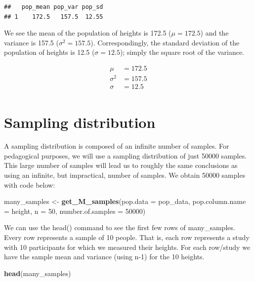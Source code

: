 \documentclass[
]{krantz}
\makeatletter
\newenvironment{Shaded}{\begin{snugshade}}{\end{snugshade}}
\newcommand{\DataTypeTok}[1]{\textcolor[rgb]{0.27,0.27,0.27}{#1}}
\newcommand{\DecValTok}[1]{\textcolor[rgb]{0.06,0.06,0.06}{#1}}
\newcommand{\KeywordTok}[1]{\textcolor[rgb]{0.27,0.27,0.27}{\textbf{#1}}}
\newcommand{\NormalTok}[1]{#1}
\newcommand{\StringTok}[1]{\textcolor[rgb]{0.5,0.5,0.5}{#1}}
\newenvironment{kframe}{%
\medskip{}
\setlength{\fboxsep}{.8em}
 \def\at@end@of@kframe{}%
 \ifinner\ifhmode%
  \def\at@end@of@kframe{\end{minipage}}%
  \begin{minipage}{\columnwidth}%
 \fi\fi%
 \def\FrameCommand##1{\hskip\@totalleftmargin \hskip-\fboxsep
 \colorbox{shadecolor}{##1}\hskip-\fboxsep
     \hskip-\linewidth \hskip-\@totalleftmargin \hskip\columnwidth}%
 \MakeFramed {\advance\hsize-\width
   \@totalleftmargin\z@ \linewidth\hsize
   \@setminipage}}%
 {\par\unskip\endMakeFramed%
 \at@end@of@kframe}
\renewenvironment{Shaded}{\begin{kframe}}{\end{kframe}}
\makeatother
\begin{document}
\begin{verbatim}
##   pop_mean pop_var pop_sd
## 1    172.5   157.5  12.55
\end{verbatim}

We see the mean of the population of heights is 172.5 (\(\mu = 172.5\)) and the variance is 157.5 (\(\sigma^2 = 157.5\)). Correspondingly, the standard deviation of the population of heights is 12.5 (\(\sigma = 12.5\)); simply the square root of the variance.

\[
\begin{aligned} 
\mu &= 172.5 \\
\sigma^2 &= 157.5 \\
\sigma &= 12.5 \\
\end{aligned} 
\]

\hypertarget{sampling-distribution}{%
\section{Sampling distribution}\label{sampling-distribution}}

A sampling distribution is composed of an infinite number of samples. For pedagogical purposes, we will use a sampling distribution of just 50000 samples. This large number of samples will lead us to roughly the same conclusions as using an infinite, but impractical, number of samples. We obtain 50000 samples with code below:

\begin{Shaded}
\begin{Highlighting}[]
\NormalTok{many_samples <-}\StringTok{ }\KeywordTok{get_M_samples}\NormalTok{(}\DataTypeTok{pop.data =}\NormalTok{ pop_data, }
                              \DataTypeTok{pop.column.name =}\NormalTok{ height,}
                              \DataTypeTok{n =} \DecValTok{50}\NormalTok{,}
                              \DataTypeTok{number.of.samples =} \DecValTok{50000}\NormalTok{)}
\end{Highlighting}
\end{Shaded}

We can use the head() command to see the first few rows of many\_samples. Every row represents a sample of 10 people. That is, each row represents a study with 10 participants for which we measured their heights. For each row/study we have the sample mean and variance (using n-1) for the 10 heights.

\begin{Shaded}
\begin{Highlighting}[]
\KeywordTok{head}\NormalTok{(many_samples)}
\end{Highlighting}
\end{Shaded}
\end{document}

